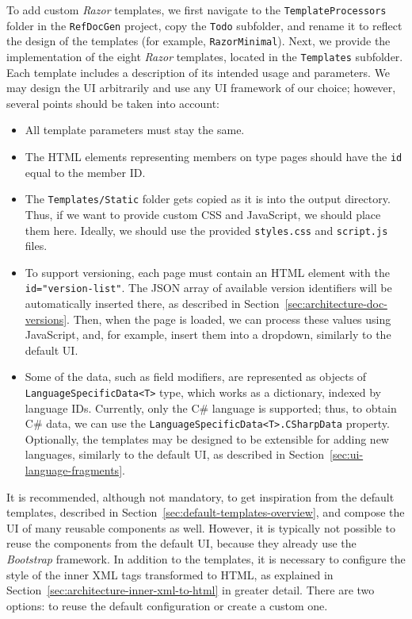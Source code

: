 To add custom \textit{Razor} templates, we first navigate to the \texttt{TemplateProcessors} folder in the \texttt{RefDocGen} project, copy the \texttt{Todo} subfolder, and rename it to reflect the design of the templates (for example, \texttt{RazorMinimal}).
Next, we provide the implementation of the eight \textit{Razor} templates, located in the \texttt{Templates} subfolder.
Each template includes a description of its intended usage and parameters.
We may design the UI arbitrarily and use any UI framework of our choice; however,
several points should be taken into account:

\begin{itemize}
    \item All template parameters must stay the same.
    \item The HTML elements representing members on type pages should have the \texttt{id} equal to the member ID.
    \item The \texttt{Templates/Static} folder gets copied as it is into the output directory.
    Thus, if we want to provide custom CSS and JavaScript, we should place them here.
    Ideally, we should use the provided \texttt{styles.css} and \texttt{script.js} files.
    \item To support versioning, each page must contain an HTML element with the \texttt{id="version-list"}.
    The JSON array of available version identifiers will be automatically inserted there, as described in Section~\ref{sec:architecture-doc-versions}.
    Then, when the page is loaded, we can process these values using JavaScript, and, for example, insert them into a dropdown, similarly to the default UI. 
    \item Some of the data, such as field modifiers, are represented as objects of \texttt{LanguageSpecificData<T>} type, 
which works as a dictionary, indexed by language IDs.
Currently, only the C\# language is supported; thus, to obtain C\# data, we can use the \texttt{LanguageSpecificData<T>.CSharpData} property.
Optionally, the templates may be designed to be extensible for adding new languages, similarly to the default UI, as described in Section~\ref{sec:ui-language-fragments}.
\end{itemize}

It is recommended, although not mandatory, to get inspiration from the default templates, described in Section~\ref{sec:default-templates-overview}, and compose the UI of many reusable components as well.
However, it is typically not possible to reuse the components from the default UI, because they already use the \textit{Bootstrap} framework.
In addition to the templates, it is necessary to configure the style of the inner XML tags transformed to HTML, as explained in Section~\ref{sec:architecture-inner-xml-to-html} in greater detail.
There are two options: to reuse the default configuration or create a custom one.

